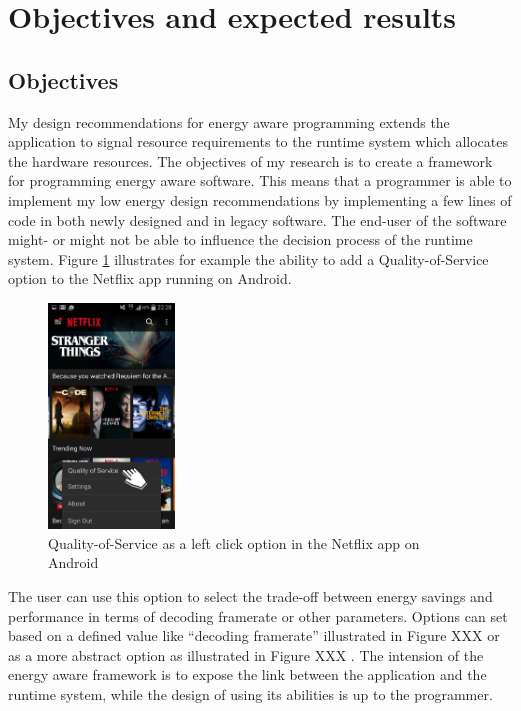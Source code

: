 \documentclass{article}
\begin{document}
\section{Objectives and expected results}
\subsection{Objectives}
My design recommendations for energy aware programming extends the application to signal resource requirements to the runtime system which allocates the hardware resources.
The objectives of my research is to create a framework for programming energy aware software. 
This means that a programmer is able to implement my low energy design recommendations by implementing a few lines of code in both newly designed and in legacy software.
The end-user of the software might- or might not be able to influence the decision process of the runtime system. 
Figure \ref{fig:netflix} illustrates for example the ability to add a Quality-of-Service option to the Netflix app running on Android. 

\begin{figure}
  \begin{center}
    \includegraphics[width=0.3\textwidth]{fig/netflix.png}
  \end{center}
  \caption{Quality-of-Service as a left click option in the Netflix app on Android}
  \label{fig:netflix}
  \vspace{-2.5cm}
\end{figure}
The user can use this option to select the trade-off between energy savings and performance in terms of decoding framerate or other parameters. 
Options can set based on a defined value like ``decoding framerate'' illustrated in Figure XXX  or as a more abstract option as illustrated in Figure XXX . 
The intension of the energy aware framework is to expose the link between the application and the runtime system, while the design of using its abilities is up to the programmer.
\end{document}
